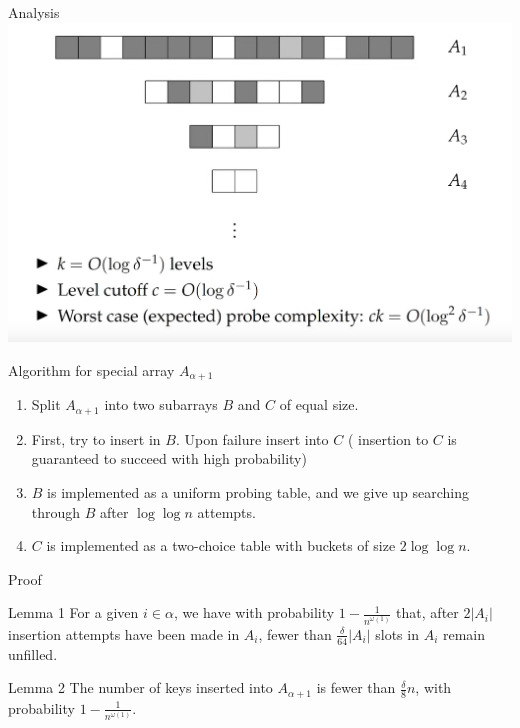 \documentclass{beamer}
\begin{document}
\begin{frame}{Analysis}
	\includegraphics[scale=0.3]{analysis}
\end{frame}


\begin{frame}{Algorithm for special array $A_{\alpha + 1}$}
	\begin{enumerate}
		\item Split $A_{\alpha + 1}$ into two subarrays $B$ and $C$ of equal size. 
		\item First, try to insert in $B$. Upon failure insert into $C$ ( insertion to $C$ is guaranteed to succeed with high probability)
		\item $B$ is implemented as a uniform probing table, and we give up searching through $B$ after $\log{\log{n}}$ attempts.
		\item $C$ is implemented as a two-choice table with buckets of size $2\log{\log{n}}$. 
	\end{enumerate}
	
\end{frame}

\begin{frame}{Proof}
	\begin{block}{Lemma 1}
		For a given $i \in \alpha$, we have with probability $1 - \frac{1}{n^{\omega(1)}}$ that, after $2|A_i|$ insertion attempts have been made in $A_i$, fewer than $\frac{\delta}{64} |A_i|$ slots in $A_i$ remain unfilled.
	\end{block}

	\begin{block}{Lemma 2}
		The number of keys inserted into $A_{\alpha + 1}$ is fewer than $\frac{\delta}{8}n$, with probability $1 - \frac{1}{n^{\omega(1)}}$.
	\end{block}

\end{frame}
\end{document}
